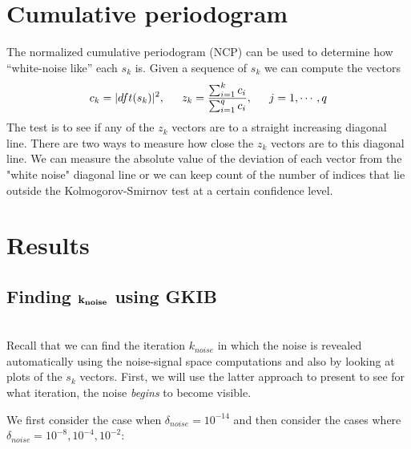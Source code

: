 \documentclass[11pt]{amsart}
\begin{document}
\section{Cumulative periodogram}
The normalized cumulative periodogram (NCP) can be used to determine how 
``white-noise like'' each $s_k$ is. Given a sequence of $s_k$ we can compute the
vectors
$$c_k = |dft(s_k)|^2, \indent z_k = \frac{\sum_{i=1}^k c_i}{ \sum_{i=1}^q c_i}, \indent j=1,\cdots, q$$ 
The test is to see if any of the $z_k$ vectors are to a straight increasing diagonal line. There are two 
ways to measure how close the $z_k$ vectors are to this diagonal line. We can measure the 
absolute value of the deviation of each vector from the "white noise" diagonal line or we can keep
count of the number of indices that lie outside the Kolmogorov-Smirnov test at a certain confidence 
level. 

\section{Results}

\subsection{Finding $\bf k_{noise}$ using GKIB} \indent \\
	Recall that we can find the iteration $k_{noise}$ in which the noise is revealed automatically
	using the noise-signal space computations and also by looking at plots of the $s_k$ vectors.
	First, we will use the latter approach to present to see for what iteration, the noise {\it begins}
    to become visible.

	We first consider the case when $\delta_{noise}=10^{-14}$ and then consider the cases
	where $\delta_{noise} = 10^{-8},10^{-4},10^{-2}$:
\end{document}
